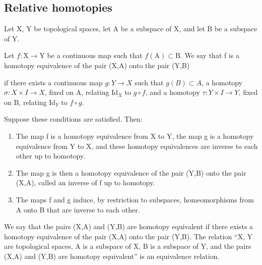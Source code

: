 \subsection{Relative homotopies}

Let X, Y be topological spaces, let A be a subspace of X, and let B be a subspace of Y.

Let \(f:\mathrm{X}\to\mathrm{Y}\) be a continuous map such that \(f(\mathrm{A})\subset\mathrm{B}\). We say that f is a homotopy equivalence of the pair (X,A) onto the pair (Y,B)

if there exists a continuous map \(g\colon Y\to X\) such that \(g(B)\subset A\), a homotopy \(\sigma\colon X\times I\to X\), fixed on A, relating \(\text{Id}_X\) to \(g\circ f\), and a homotopy \(\tau\colon Y\times I\to Y\), fixed on B, relating \(\text{Id}_Y\) to \(f\circ g\).

Suppose these conditions are satisfied. Then:

\begin{enumerate}
\def\labelenumi{\alph{enumi})}
\item
  The map f is a homotopy equivalence from X to Y, the map g is a homotopy equivalence from Y to X, and these homotopy equivalences are inverse to each other up to homotopy.
\item
  The map g is then a homotopy equivalence of the pair (Y,B) onto the pair (X,A), called an inverse of f up to homotopy.
\item
  The maps f and g induce, by restriction to subspaces, homeomorphisms from A onto B that are inverse to each other.
\end{enumerate}

We say that the pairs (X,A) and (Y,B) are homotopy equivalent if there exists a homotopy equivalence of the pair (X,A) onto the pair (Y,B). The relation “X, Y are topological spaces, A is a subspace of X, B is a subspace of Y, and the pairs (X,A) and (Y,B) are homotopy equivalent” is an equivalence relation.

